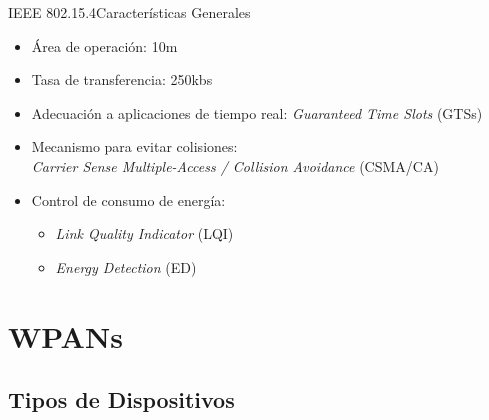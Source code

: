 \documentclass[aspectratio=169]{beamer}
\begin{document}
\begin{frame}{IEEE 802.15.4}{Características Generales}
	
	\begin{itemize}
		\item Área de operación: 10m
		\vspace{5px}
		\item Tasa de transferencia: 250kbs
		\vspace{5px}
		\item Adecuación a aplicaciones de tiempo real: \textit{Guaranteed Time Slots} (GTSs)
		\vspace{5px}
		\item Mecanismo para evitar colisiones:\\ \textit{Carrier Sense Multiple-Access / Collision Avoidance} (CSMA/CA)
		\vspace{5px}
		\item Control de consumo de energía: 
		\begin{itemize}
			\item \textit{Link Quality Indicator} (LQI)
			\item \textit{Energy Detection} (ED)
		\end{itemize}
	\end{itemize}
	
\end{frame}


\section{WPANs}

\subsection[Dispositivos]{Tipos de Dispositivos}
\end{document}
